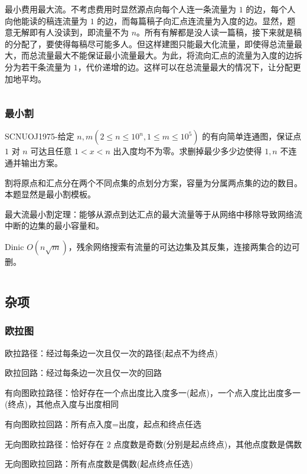 \documentclass[twocolumn,10pt]{ctexart}
\begin{document}
最小费用最大流。不考虑费用时显然源点向每个人连一条流量为 $1$ 的边，每个人向他能读的稿连流量为 $1$ 的边，而每篇稿子向汇点连流量为入度的边。显然，题意无解即有人没读到，即流量不为 $n$。所有有解都是没人读一篇稿，接下来就是稿的分配了，要使得每稿尽可能多人。但这样建图只能最大化流量，即使得总流量最大，而总流量最大不能保证最小流量最大。为此，将流向汇点的流量为入度的边拆分为若干条流量为 $1$，代价递增的边。这样可以在总流量最大的情况下，让分配更加地平均。

\inputminted{cpp}{code/min_cost_max_flow.cpp}

\subsubsection{最小割}

\begin{notebox}
SCNUOJ1975-给定 $n,\allowbreak{}m(2\le n\le10^n,\allowbreak{}1\le m\le10^5)$ 的有向简单连通图，保证点 $1$ 对 $n$ 可达且任意 $1<x<n$ 出入度均不为零。求删掉最少多少边使得 $1,n$ 不连通并输出方案。
\end{notebox}

割将原点和汇点分在两个不同点集的点划分方案，容量为分属两点集的边的数目。本题显然是最小割模板。

最大流最小割定理：能够从源点到达汇点的最大流量等于从网络中移除导致网络流中断的边集的最小容量和。

Dinic $O(n\sqrt m)$，残余网络搜索有流量的可达边集及其反集，连接两集合的边可删。

\inputminted{cpp}{code/ext_052.cpp}

\subsection{杂项}

\subsubsection{欧拉图}

欧拉路径：经过每条边一次且仅一次的路径(起点不为终点)

欧拉回路：经过每条边一次且仅一次的回路

有向图欧拉路径：恰好存在一个点出度比入度多一(起点)，一个点入度比出度多一(终点)，其他点入度与出度相同

有向图欧拉回路：所有点入度=出度，起点和终点任选

无向图欧拉路径：恰好存在 $2$ 点度数是奇数(分别是起点终点)，其他点度数是偶数

无向图欧拉回路：所有点度数是偶数(起点终点任选)
\end{document}
